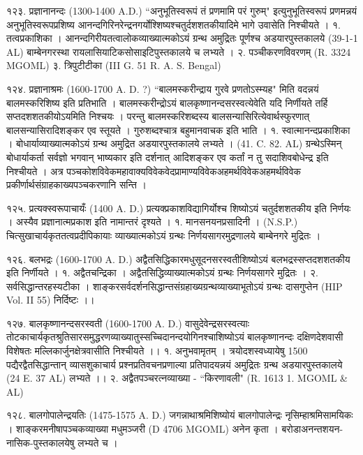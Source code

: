 १२३. प्रज्ञानानन्दः (1300-1400 A.D.)
``अनुभूतिस्वरूपं तं प्रणमामि परं गुरुम्" इत्युनुभूतिस्वरूपं प्रणमन्नयं अनुभूतिस्वरूपप्रशिष्य आनन्दगिरिनरेन्द्रनगर्योश्शिष्यश्चतुर्दशशतकीयादिमे भागे उवासेति निश्चीयते ।
१. तत्वप्रकाशिका । आनन्दगिरीयतत्वालोकव्याख्यात्मकोऽयं ग्रन्थ अमुद्रितः पूर्णश्च अडयारपुस्तकालये (39-1-1 AL) बाम्बेनगरस्था रायलासियाटिकसोसाइटिपुस्तकालये च लभ्यते ।
२. पञ्चीकरणविवरणम् (R. 3324 MGOML)
३. त्रिपुटीटीका (III G. 51 R. A. S. Bengal)

१२४. प्रज्ञानाश्रमः (1600-1700 A. D. ?)
``बालमस्करीन्द्राय गुरवे प्रणतोऽस्म्यह" मिति वदन्नयं बालमस्करिशिष्य इति प्रतिभाति । बालमस्करीन्द्रोऽयं बालकृष्णानन्दसरस्वत्येवेति यदि निर्णीयते तर्हि सप्तदशशतकीयोऽयमिति निश्चयः । परन्तु बालमस्करिशब्दस्य बालसन्यासिरित्येवार्थस्फुरणात् बालसन्यासिरादिशङ्कर एव स्तूयते । गुरुशब्दश्चात्र बहुमानवाचक इति भाति ।
१. स्वात्मानन्दप्रकाशिका । बोधार्याव्याख्यात्मकोऽयं ग्रन्थ अमुद्रित अडयारपुस्तकालये लभ्यते । (41. C. 82. AL) ग्रन्थेऽस्मिन् बोधार्याकर्ता सर्वज्ञो भगवान् भाष्यकार इति दर्शनात् आदिशङ्कर एव कर्तां न तु सदाशिवबोधेन्द्र इति निश्चीयते । अत्र पञ्चकोशविवेकमहावाक्यविवेकवेदप्रामाण्यविवेकअहमर्थविवेकअहमर्थविवेक प्रकीर्णार्थसंग्राहकाख्यपञ्चकरणानि सन्ति ।

१२५. प्रत्यक्स्वरूपाचायँः (1400 A. D.)
प्रत्यक्प्रकाशविद्यागिर्योश्च शिष्योऽयं चतुर्दशशतकीय इति निर्णयः । अस्यैव प्रज्ञानात्मप्रकाश इति नामान्तरं दृश्यते ।
१. मानसनयनप्रसादिनी । (N.S.P.) चित्सुखाचार्यकृततत्वप्रदीपिकायाः व्याख्यात्मकोऽयं ग्रन्थः निर्णयसागरमुद्रणालये बाम्बेनगरे मुद्रितः ।

१२६. बलभद्रः (1600-1700 A. D.)
अद्वैतसिद्धिकारमधुसूदनसरस्वतीशिष्योऽयं बलभद्रस्सप्तदशशतकीय इति निर्णीयते ।
१. अद्वैतचन्द्रिका । अद्वैतसिद्धिव्याख्यात्मकोऽयं ग्रन्थः निर्णयसागरे मुद्रितः ।
२. सर्वसिद्धान्तरहस्यटीका । शाङ्करसर्वदर्शनसिद्धान्तसंग्रहाख्यग्रन्थव्याख्याभूतोऽयं ग्रन्थः दासगुप्तेन (HIP Vol. II 55) निर्दिष्टः ।।

१२७. बालकृष्णानन्दसरस्वती (1600-1700 A. D.)
वासुदेवेन्द्रसरस्वत्याः तोटकाचार्यकृतश्रुतिसारसमुद्धरणव्याख्यातुस्सच्चिदानन्दयोगिनश्चाशिष्योऽयं बालकृष्णानन्दः दक्षिणदेशवासी विशेषतः मल्लिकार्जुनक्षेत्रवासीति निश्चीयते ।।
१. अनुभवामृतम् । त्रयोदशस्वध्यायेषु 1500 पद्यैरद्वैतसिद्धान्तान् व्यासशुकाचार्य प्रश्नप्रतिवचनप्रणाल्या प्रतिपादयन्नयं अमुद्रितः ग्रन्थ अडयारपुस्तकालये (24 E. 37 AL) लभ्यते ।।
२. अद्वैतपञ्चरत्नव्याख्या - ``किरणावली" (R. 1613 1. MGOML & AL)

१२८. बालगोपालेन्द्रयतिः (1475-1575 A. D.)
जगन्नाथाश्रमिशिष्योयं बालगोपालेन्द्रः नृसिम्हाश्रमिसामयिकः । शाङ्करमनीषापञ्चकव्याख्या मधुमञ्जरी (D 4706 MGOML) अनेन कृता । बरोडाअनन्तशयन-नासिक-पुस्तकालयेषु लभ्यते च ।

